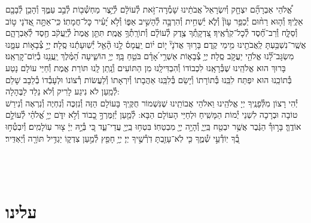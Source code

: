 \documentclass[twoside, openany, parskip=half, 11pt]{book}
\begin{document}
\begin{sometimes}
%
אֱ֠לֹהֵי אַבְרָהָ֞ם יִצְחָ֤ק וְ֯יִשְׂרָאֵל֙ אֲבֹתֵ֔ינוּ שָׁמְ֯רָה־זֹּ֣את לְ֯עוֹלָ֔ם לְ֯יֵ֥צֶר מַחְשְׁ֯ב֖וֹת לְ֯בַ֣ב עַמֶּ֑ךָ וְ֯הָכֵ֥ן לְ֯בָבָ֖ם אֵלֶֽיךָ׃ וְ֯ה֤וּא
%
רַח֨וּם יְ֯כַפֵּ֥ר עָוֹן֘ וְ֯לֹ֢א יַ֫שְׁחִ֥ית וְ֯הִרְבָּ֣ה לְ֯הָשִׁ֣יב אַפּ֑וֹ וְ֯לֹ֣א יָ֝עִ֗יר כׇּל־חֲמָתֽוֹ׃ כִּֽי־אַתָּ֣ה
%
אֲ֭דֹנָי ט֣וֹב וְ֯סַלָּ֑ח וְ֯רַב־חֶ֝֗סֶד לְ֯כׇל־קֹֽרְ֯אֶֽיךָ׃ צִ֭דְקָֽתְ֯ךָ
%
צֶ֥דֶק לְ֯עוֹלָ֗ם וְ֯תוֹרָֽתְ֯ךָ֥ אֱמֶֽת׃ תִּתֵּ֤ן
%
אֱמֶת֙ לְ֯יַֽעֲקֹ֔ב חֶ֖סֶד לְ֯אַבְרָהָ֑ם אֲשֶֽׁר־נִשְׁבַּ֥עְתָּ לַֽאֲבֹתֵ֖ינוּ מִ֥ימֵי קֶֽדֶם׃ בָּר֥וּךְ
%
אֲדֹנָי֘ י֤וֹם י֗וֹם יַֽעֲמָס֫ לָ֥נוּ הָ֘אֵ֤ל יְ֯שֽׁוּעָתֵ֬נוּ סֶֽלָה׃ יְיָ֣
%
צְ֯בָא֣וֹת עִמָּ֑נוּ מִשְׂגָּב־לָ֝֗נוּ אֱלֹהֵ֖י יַעֲקֹ֣ב סֶֽלָה׃ יְיָ֥
%
צְ֯בָא֑וֹת אַשְׁרֵ֥י ֝אָדָ֗ם בֹּטֵ֥חַ בָּֽךְ׃ יְיָ֥
%
הוֹשִׁ֑יעָה הַ֝מֶּ֗לֶךְ יַֽעֲנֵ֥נוּ בְ֯יֽוֹם־קׇרְאֵֽנוּ׃ \\
בָּרוּךְ הוּא אֱלֹהֵֽינוּ שֶׁבְּ֯רָאָֽנוּ לִכְבוֹדוֹ וְ֯הִבְדִּילָֽנוּ מִן הַתּוֹעִים וְ֯נָֽתַן לָֽנוּ תּוֹרַת אֱמֶת וְ֯חַיֵּי עוֹלָם נָטַע בְּ֯תוֹכֵֽנוּ הוּא יִפְתַּח לִבֵּֽנוּ בְּ֯תוֹרָתוֹ וְ֯יָשֵׂם בְּ֯לִבֵּֽנוּ אַהֲבָתוֹ וְ֯יִרְאָתוֹ וְ֯לַעֲשׂוֹת רְ֯צוֹנוֹ וּלְעָבְ֯דוֹ בְ֯לֵבָב שָׁלֵם לְ֯מַֽעַן לֹא נִיגַע לָרִיק וְ֯לֹא נֵלֵד לַבֶּהָלָה:\\
יְ֯הִי רָצוֹן מִלְּ֯פָנֶֽיךָ יְיָ אֱלֹהֵֽינוּ וֵאלֹהֵי אֲבוֹתֵֽינוּ שֶׁנִּשְׁמוֹר חֻקֶּֽיךָ בָּעוֹלָם הַזֶּה וְ֯נִזְכֶּה וְ֯נִחְיֶה וְ֯נִרְאֶה וְ֯נִירַשׁ טוֹבָה וּבְרָכָה לִשְׁנֵי יְ֯מוֹת הַמָּשִֽׁיחַ וּלְחַיֵּי הָעוֹלָם הַבָּא: לְ֯מַ֤עַן יְ֯זַמֶּרְךָ֣ כָ֭בוֹד וְ֯לֹ֣א יִדֹּ֑ם יְיָ֥ אֱ֝לֹהַ֗י לְ֯עוֹלָ֣ם אוֹדֶֽךָּ׃ בָּר֣וּךְ֯ הַגֶּ֔בֶר אֲשֶׁ֥ר יִבְטַ֖ח בַּֽיְיָ֑ וְ֯הָיָ֥ה יְיָ֖ מִבְטַחֽוֹ׃ בִּטְח֥וּ
%
בַֽיְיָ֖ עֲדֵי־עַ֑ד כִּ֚י בְּ֯יָ֣הּ יְיָ֔ צ֖וּר עֽוֹלָמִֽים׃ וְ֯יִבְטְ֯ח֣וּ
%
בְ֭֯ךָ יֽוֹדְ֯עֵ֣י שְׁ֯מֶ֑ךָ כִּ֤י לֹֽא־עָזַ֖בְתָּ דֹֽרְ֯שֶׁ֣יךָ יְיָ׃ יְיָ֥
%
חָפֵ֖ץ לְ֯מַ֣עַן צִדְק֑וֹ יַגְדִּ֥יל תּוֹרָ֖ה וְ֯יַאְדִּֽיר׃

\end{sometimes}

\fullkaddish

\vfill

\\
\\

\clearpage
\section*{ עלינו }
\end{document}
